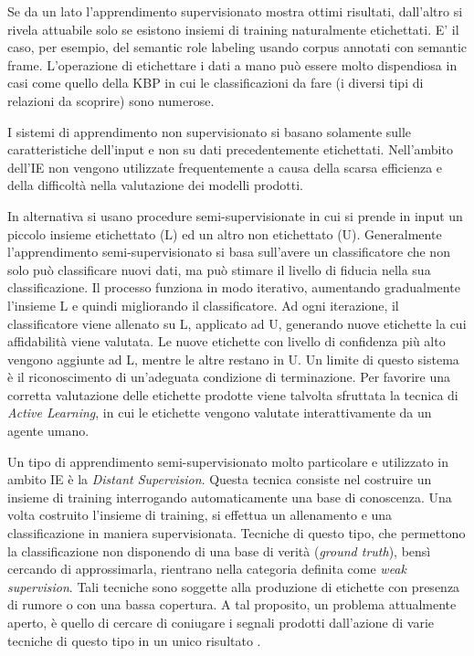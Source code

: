 Se da un lato l'apprendimento supervisionato mostra ottimi risultati, dall'altro si rivela attuabile solo se esistono insiemi di training naturalmente etichettati. E' il caso, per esempio, del semantic role labeling usando corpus annotati con semantic frame. L'operazione di etichettare i dati a mano può essere molto dispendiosa in casi come quello della KBP in cui le classificazioni da fare (i diversi tipi di relazioni da scoprire) sono numerose.

I sistemi di apprendimento non supervisionato si basano solamente sulle caratteristiche dell'input e non su dati precedentemente etichettati. Nell'ambito dell'IE non vengono utilizzate frequentemente a causa della scarsa efficienza e della difficoltà nella valutazione dei modelli prodotti. 

In alternativa si usano procedure semi-supervisionate in cui si prende in input un piccolo insieme etichettato (L) ed un altro non etichettato (U). Generalmente l'apprendimento semi-supervisionato si basa sull'avere un classificatore che non solo può classificare nuovi dati, ma può stimare il livello di fiducia nella sua classificazione. Il processo funziona in modo iterativo, aumentando gradualmente l'insieme L e quindi migliorando il classificatore. Ad ogni iterazione, il classificatore viene allenato su L, applicato ad U, generando nuove etichette la cui affidabilità viene valutata. Le nuove etichette con livello di confidenza più alto vengono aggiunte ad L, mentre le altre restano in U. Un limite di questo sistema è il riconoscimento di un'adeguata condizione di terminazione. Per favorire una corretta valutazione delle etichette prodotte viene talvolta sfruttata la tecnica di \textit{Active Learning}, in cui le etichette vengono valutate interattivamente da un agente umano.

Un tipo di apprendimento semi-supervisionato molto particolare e utilizzato in ambito IE è la \textit{Distant Supervision}. Questa tecnica consiste nel costruire un insieme di training interrogando automaticamente una base di conoscenza. Una volta costruito l'insieme di training, si effettua un allenamento e una classificazione in maniera supervisionata. Tecniche di questo tipo, che permettono la classificazione non disponendo di una base di verità (\textit{ground truth}), bensì cercando di approssimarla, rientrano nella categoria definita come \textit{weak supervision}.
Tali tecniche sono soggette alla produzione di etichette con presenza di rumore o con una bassa copertura. A tal proposito, un problema attualmente aperto, è quello di cercare di coniugare i segnali prodotti dall'azione di varie tecniche di questo tipo in un unico risultato \cite{Ratner2017SnorkelFT}.


